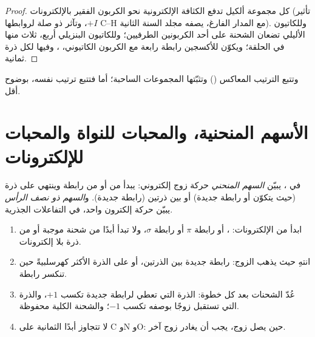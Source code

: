 \begin{proof}
كل مجموعة ألكيل تدفع الكثافة الإلكترونية نحو الكربون الفقير
بالإلكترونات (تأثير $+I$، وتآثر ذو صلة لروابطها C--H مع المدار
الفارغ، يصفه مجلد السنة الثانية). وللكاتيون الأليلي
 تضعان الشحنة على أحد الكربونين الطرفيين؛ وللكاتيون
البنزيلي أربع، ثلاث منها في الحلقة؛ ويكوّن  للأكسجين
رابطة رابعة مع الكربون الكاتيوني، ، وفيها لكل ذرة
ثمانية.
\end{proof}

وتتبع  الترتيب المعاكس () وتثبّتها المجموعات الساحبة؛ أما  فتتبع
ترتيب  نفسه، بوضوح أقل.

\section{الأسهم المنحنية، والمحبات للنواة والمحبات للإلكترونات}

\begin{definition}\label{def:b1:electronic-effects:curly-arrow}
في ، يبيّن \emph{السهم المنحني}
حركة زوج إلكتروني: يبدأ من  أو من رابطة وينتهي
على ذرة (حيث يتكوّن  أو رابطة جديدة) أو بين ذرتين (رابطة
جديدة). و\emph{السهم ذو نصف الرأس} يبيّن
حركة إلكترون واحد، في التفاعلات الجذرية.
\end{definition}

\begin{method}\label{met:b1:electronic-effects:curly-arrows}
\begin{enumerate}
  \item ابدأ من الإلكترونات: ، أو رابطة $\pi$ أو رابطة $\sigma$،
        ولا تبدأ أبدًا من شحنة موجبة أو من ذرة بلا إلكترونات.
  \item انتهِ حيث يذهب الزوج: رابطة جديدة بين الذرتين، أو
         على الذرة الأكثر كهرسلبيةً حين تنكسر رابطة.
  \item عُدّ الشحنات بعد كل خطوة: الذرة التي تعطي  لرابطة
        جديدة تكسب $+1$، والذرة التي تستقبل زوجًا بوصفه 
        تكسب $-1$؛ والشحنة الكلية محفوظة.
  \item لا تتجاوز أبدًا الثمانية على C وN وO: حين يصل زوج، يجب أن
        يغادر زوج آخر.
\end{enumerate}
\end{method}

